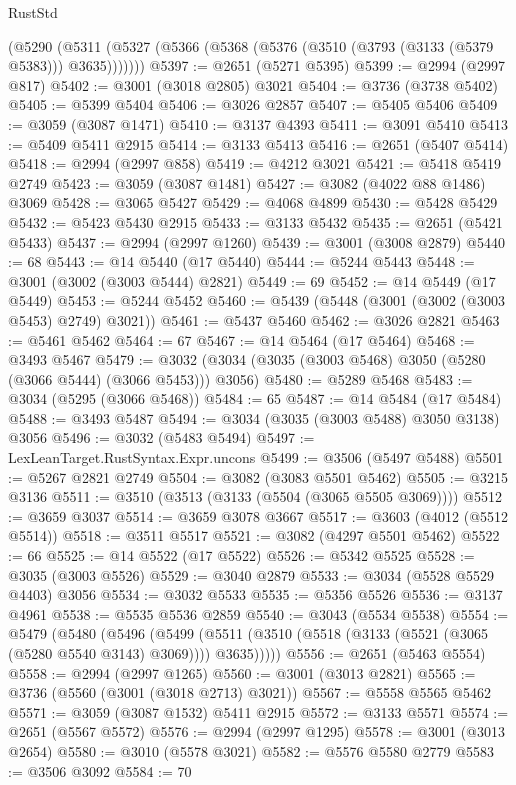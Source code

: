 \begin{lexlean}{RustStd}
\begin{coremodule}
    (@5290 (@5311 (@5327 (@5366 (@5368 (@5376 (@3510 (@3793 (@3133 (@5379 @5383))) @3635)))))))
@5397 := @2651 (@5271 @5395)
@5399 := @2994 (@2997 @817)
@5402 := @3001 (@3018 @2805) @3021
@5404 := @3736 (@3738 @5402)
@5405 := @5399 @5404
@5406 := @3026 @2857
@5407 := @5405 @5406
@5409 := @3059 (@3087 @1471)
@5410 := @3137 @4393
@5411 := @3091 @5410
@5413 := @5409 @5411 @2915
@5414 := @3133 @5413
@5416 := @2651 (@5407 @5414)
@5418 := @2994 (@2997 @858)
@5419 := @4212 @3021
@5421 := @5418 @5419 @2749
@5423 := @3059 (@3087 @1481)
@5427 := @3082 (@4022 @88 @1486) @3069
@5428 := @3065 @5427
@5429 := @4068 @4899
@5430 := @5428 @5429
@5432 := @5423 @5430 @2915
@5433 := @3133 @5432
@5435 := @2651 (@5421 @5433)
@5437 := @2994 (@2997 @1260)
@5439 := @3001 (@3008 @2879)
@5440 := 68
@5443 := @14 @5440 (@17 @5440)
@5444 := @5244 @5443
@5448 := @3001 (@3002 (@3003 @5444) @2821)
@5449 := 69
@5452 := @14 @5449 (@17 @5449)
@5453 := @5244 @5452
@5460 := @5439 (@5448 (@3001 (@3002 (@3003 @5453) @2749) @3021))
@5461 := @5437 @5460
@5462 := @3026 @2821
@5463 := @5461 @5462
@5464 := 67
@5467 := @14 @5464 (@17 @5464)
@5468 := @3493 @5467
@5479 := @3032 (@3034 (@3035 (@3003 @5468) @3050 (@5280 (@3066 @5444) (@3066 @5453))) @3056)
@5480 := @5289 @5468
@5483 := @3034 (@5295 (@3066 @5468))
@5484 := 65
@5487 := @14 @5484 (@17 @5484)
@5488 := @3493 @5487
@5494 := @3034 (@3035 (@3003 @5488) @3050 @3138) @3056
@5496 := @3032 (@5483 @5494)
@5497 := LexLeanTarget.RustSyntax.Expr.uncons
@5499 := @3506 (@5497 @5488)
@5501 := @5267 @2821 @2749
@5504 := @3082 (@3083 @5501 @5462)
@5505 := @3215 @3136
@5511 := @3510 (@3513 (@3133 (@5504 (@3065 @5505 @3069))))
@5512 := @3659 @3037
@5514 := @3659 @3078 @3667
@5517 := @3603 (@4012 (@5512 @5514))
@5518 := @3511 @5517
@5521 := @3082 (@4297 @5501 @5462)
@5522 := 66
@5525 := @14 @5522 (@17 @5522)
@5526 := @5342 @5525
@5528 := @3035 (@3003 @5526)
@5529 := @3040 @2879
@5533 := @3034 (@5528 @5529 @4403) @3056
@5534 := @3032 @5533
@5535 := @5356 @5526
@5536 := @3137 @4961
@5538 := @5535 @5536 @2859
@5540 := @3043 (@5534 @5538)
@5554 := @5479
    (@5480
      (@5496
        (@5499 (@5511 (@3510 (@5518 (@3133 (@5521 (@3065 (@5280 @5540 @3143) @3069)))) @3635)))))
@5556 := @2651 (@5463 @5554)
@5558 := @2994 (@2997 @1265)
@5560 := @3001 (@3013 @2821)
@5565 := @3736 (@5560 (@3001 (@3018 @2713) @3021))
@5567 := @5558 @5565 @5462
@5571 := @3059 (@3087 @1532) @5411 @2915
@5572 := @3133 @5571
@5574 := @2651 (@5567 @5572)
@5576 := @2994 (@2997 @1295)
@5578 := @3001 (@3013 @2654)
@5580 := @3010 (@5578 @3021)
@5582 := @5576 @5580 @2779
@5583 := @3506 @3092
@5584 := 70

\end{coremodule}
\end{lexlean}
